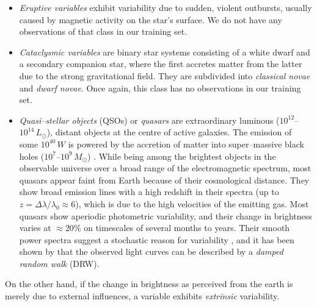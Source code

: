 \begin{itemize}
\item \emph{Eruptive variables} exhibit variability due to sudden, violent outbursts, usually caused by magnetic activity on the star's surface. We do not have any observations of that class in our training set.
\item \emph{Cataclysmic variables} are binary star systems consisting of a white dwarf and a secondary companion star, where the first accretes matter from the latter due to the strong gravitational field. They are subdivided into \emph{classical novae} and \emph{dwarf novae}. Once again, this class has no observations in our training set.

\item \emph{Quasi--stellar objects} (QSOs) or \emph{quasars} are extraordinary luminous ($10^{12}$--$10^{14} \, \unit{L_\odot}$), distant objects at the centre of active galaxies. The emission of some $10^{40} \, \unit{W}$ is powered by the accretion of matter into super--massive black holes ($10^7$--$10^9 \, \unit{M_\odot}$) \citep{hanslmeier2007}. While being among the brightest objects in the observable universe over a broad range of the electromagnetic spectrum, most quasars appear faint from Earth because of their cosmological distance. They show broad emission lines with a high redshift in their spectra (up to $z  = \Delta \lambda / \lambda_0 \approx 6$), which is due to the high velocities of the emitting gas. Most quasars show aperiodic photometric variability, and their change in brightness varies at $\approx 20\%$ on timescales of several months to years. Their smooth power spectra suggest a stochastic reason for variability \citep{macleod2010}, and it has been shown by \citet{kozlowski2010} that the observed light curves can be described by a \emph{damped random walk} (DRW).

\end{itemize}

On the other hand, if the change in brightness as perceived from the earth is merely due to external influences, a variable exhibits \emph{extrinsic} variability.


